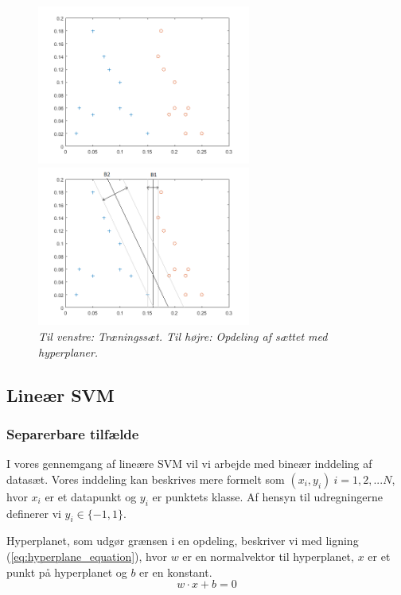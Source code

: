\documentclass{article}
\begin{document}
\begin{figure}[H]
	\begin{minipage}[t]{0.6\linewidth}
		\includegraphics[width=7cm]{maximal_margin_hyperplane_1}
	\end{minipage}
	\begin{minipage}[t]{0.1\linewidth}
		\includegraphics[width=7cm]{maximal_margin_hyperplane_2}
	\end{minipage}
	\caption{\textit{Til venstre: Træningssæt. Til højre: Opdeling af sættet med hyperplaner.}}
\end{figure}


\subsection{Lineær SVM}
\subsubsection{Separerbare tilfælde}
I vores gennemgang af lineære SVM vil vi arbejde med bineær inddeling af datasæt. Vores inddeling kan beskrives mere formelt som $(x_i,y_i) \ i=1,2,...N$, hvor $x_i$ er et datapunkt og $y_i$ er punktets klasse. Af hensyn til udregningerne definerer vi $y_i \in \{-1,1\}$.

Hyperplanet, som udgør grænsen i en opdeling, beskriver vi med ligning (\ref{eq:hyperplane_equation}), hvor $w$ er en normalvektor til hyperplanet, $x$ er et punkt på hyperplanet og $b$ er en konstant.
\begin{equation}
\label{eq:hyperplane_equation}
w \cdot x + b = 0
\end{equation}
\end{document}

